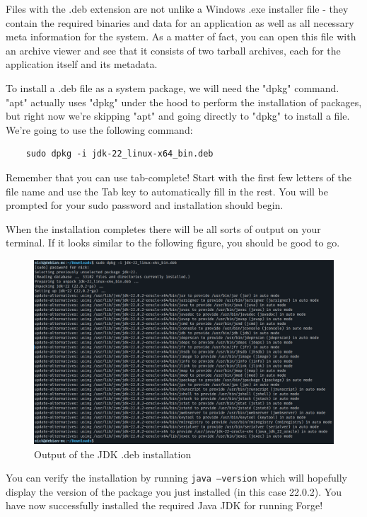 \documentclass[]{article}
\begin{document}
Files with the .deb extension are not unlike a Windows .exe installer file - they contain the required binaries and data for an application as well as all necessary meta information for the system. As a matter of fact, you can open this file with an archive viewer and see that it consists of two tarball archives, each for the application itself and its metadata.

To install a .deb file as a system package, we will need the "dpkg" command. "apt" actually uses "dpkg" under the hood to perform the installation of packages, but right now we're skipping "apt" and going directly to "dpkg" to install a file. We're going to use the following command:

\begin{verbatim}
	sudo dpkg -i jdk-22_linux-x64_bin.deb
\end{verbatim}

Remember that you can use tab-complete! Start with the first few letters of the file name and use the Tab key to automatically fill in the rest. You will be prompted for your sudo password and installation should begin.

When the installation completes there will be all sorts of output on your terminal. If it looks similar to the following figure, you should be good to go.

\begin{figure}[h!]
	\caption{Output of the JDK .deb installation}
	\centering
	\includegraphics[width=1\textwidth]{jdk-output}
\end{figure}
\FloatBarrier

You can verify the installation by running \texttt{java --version} which will hopefully display the version of the package you just installed (in this case 22.0.2). You have now successfully installed the required Java JDK for running Forge!
\end{document}
